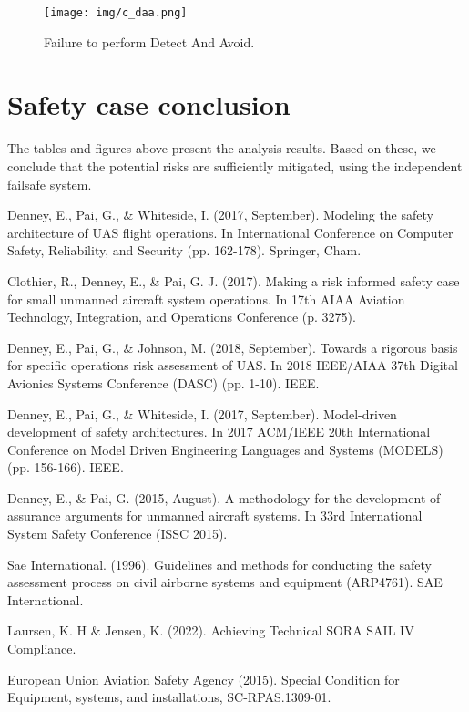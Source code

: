 \documentclass[10pt,a4paper]{report}
\begin{document}
\begin{figure}[h!]
    \centering
    \texttt{[image: img/c\_daa.png]}
    \caption{Failure to perform Detect And Avoid.}
    \label{fig:c_daa}
\end{figure}

\section{Safety case conclusion}
The tables and figures above present the analysis results. Based on these, we conclude that the potential risks are sufficiently mitigated, using the independent failsafe system.

\begin{thebibliography}{9}
Denney, E., Pai, G., \& Whiteside, I. (2017, September). Modeling the safety architecture of UAS flight operations. In International Conference on Computer Safety, Reliability, and Security (pp. 162-178). Springer, Cham.

Clothier, R., Denney, E., \& Pai, G. J. (2017). Making a risk informed safety case for small unmanned aircraft system operations. In 17th AIAA Aviation Technology, Integration, and Operations Conference (p. 3275).

Denney, E., Pai, G., \& Johnson, M. (2018, September). Towards a rigorous basis for specific operations risk assessment of UAS. In 2018 IEEE/AIAA 37th Digital Avionics Systems Conference (DASC) (pp. 1-10). IEEE.

Denney, E., Pai, G., \& Whiteside, I. (2017, September). Model-driven development of safety architectures. In 2017 ACM/IEEE 20th International Conference on Model Driven Engineering Languages and Systems (MODELS) (pp. 156-166). IEEE.

Denney, E., \& Pai, G. (2015, August). A methodology for the development of assurance arguments for unmanned aircraft systems. In 33rd International System Safety Conference (ISSC 2015).

Sae International. (1996). Guidelines and methods for conducting the safety assessment process on civil airborne systems and equipment (ARP4761). SAE International.

Laursen, K. H \& Jensen, K. (2022). Achieving Technical SORA SAIL IV Compliance.

European Union Aviation Safety Agency (2015). Special Condition for Equipment, systems, and installations, SC-RPAS.1309-01.


\end{thebibliography}
\end{document}
